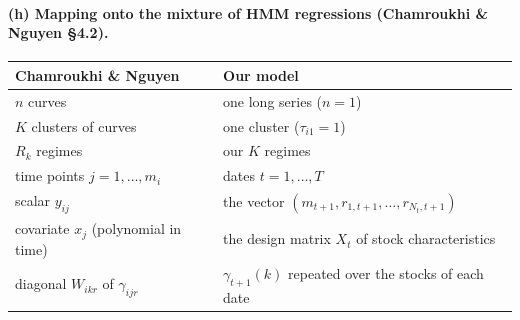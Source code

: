 \paragraph{(h) Mapping onto the mixture of HMM regressions (Chamroukhi \& Nguyen \S4.2).}
\begin{center}
\renewcommand{\arraystretch}{1.25}
\begin{tabular}{@{}ll@{}}
\toprule
Chamroukhi \& Nguyen & Our model \\
\midrule
$n$ curves & one long series ($n=1$) \\
$K$ clusters of curves & one cluster ($\tau_{i1}=1$) \\
$R_k$ regimes & our $K$ regimes \\
time points $j=1,\dots,m_i$ & dates $t=1,\dots,T$ \\
scalar $y_{ij}$ & the vector $(m_{t+1},r_{1,t+1},\dots,r_{N_t,t+1})$ \\
covariate $x_j$ (polynomial in time) & the design matrix $X_t$ of stock characteristics \\
diagonal $W_{ikr}$ of $\gamma_{ijr}$ & $\gamma_{t+1}(k)$ repeated over the stocks of each date \\
\bottomrule
\end{tabular}
\end{center}
\newpage
